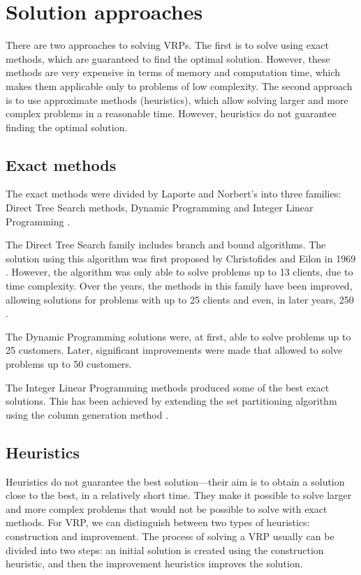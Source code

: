 \documentclass[a4paper,twoside,12pt]{book}
\begin{document}
\section{Solution approaches}

There are two approaches to solving VRPs. The first is to solve using exact methods, which are guaranteed to find the optimal solution. However, these methods are very expensive in terms of memory and computation time, which makes them applicable only to problems of low complexity. The second approach is to use approximate methods (heuristics), which allow solving larger and more complex problems in a reasonable time. However, heuristics do not guarantee finding the optimal solution. 

\subsection{Exact methods}
The exact methods were divided by Laporte and Norbert's into three families: Direct Tree Search methods, Dynamic Programming and Integer Linear Programming \cite{bib:chapter:ExactMethods}.

The Direct Tree Search family includes branch and bound algorithms. The solution using this algorithm was first proposed by Christofides and Eilon in 1969 \cite{bib:article:Eilon}. However, the algorithm was only able to solve problems up to 13 clients, due to time complexity. Over the years, the methods in this family have been improved, allowing solutions for problems with up to 25 \cite{bib:article:LowerBound} clients and even, in later years, 250 \cite{bib:article:Laporte}.

The Dynamic Programming solutions were, at first, able to solve problems up to 25 customers. Later, significant improvements were made that allowed to solve problems up to 50 customers.

The Integer Linear Programming methods produced some of the best exact solutions. This has been achieved by extending the set partitioning algorithm using the column generation method \cite{bib:article:ILP}. 

\subsection{Heuristics}
Heuristics do not guarantee the best solution---their aim is to obtain a solution close to the best, in a relatively short time. They make it possible to solve larger and more complex problems that would not be possible to solve with exact methods. For VRP, we can distinguish between two types of heuristics: construction and improvement. The process of solving a VRP usually can be divided into two steps: an initial solution is created using the construction heuristic, and then the improvement heuristics improves the solution. 
\end{document}
